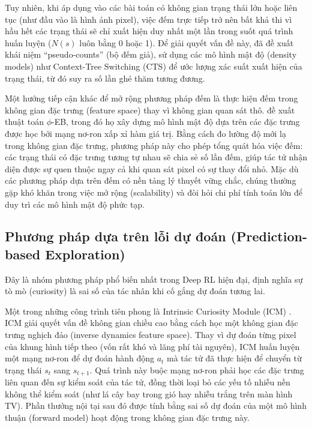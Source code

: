 \documentclass{uetgraduation}
\begin{document}
Tuy nhiên, khi áp dụng vào các bài toán có không gian trạng thái lớn hoặc liên tục (như đầu vào là hình ảnh pixel), việc đếm trực tiếp trở nên bất khả thi vì hầu hết các trạng thái sẽ chỉ xuất hiện duy nhất một lần trong suốt quá trình huấn luyện ($N(s)$ luôn bằng 0 hoặc 1). Để giải quyết vấn đề này, \cite{bellemare2016} đã đề xuất khái niệm ``pseudo-counts'' (bộ đếm giả), sử dụng các mô hình mật độ (density models) như Context-Tree Switching (CTS) để ước lượng xác suất xuất hiện của trạng thái, từ đó suy ra số lần ghé thăm tương đương.

Một hướng tiếp cận khác để mở rộng phương pháp đếm là thực hiện đếm trong không gian đặc trưng (feature space) thay vì không gian quan sát thô. \cite{martin2017} đề xuất thuật toán $\phi$-EB, trong đó họ xây dựng mô hình mật độ dựa trên các đặc trưng được học bởi mạng nơ-ron xấp xỉ hàm giá trị. Bằng cách đo lường độ mới lạ trong không gian đặc trưng, phương pháp này cho phép tổng quát hóa việc đếm: các trạng thái có đặc trưng tương tự nhau sẽ chia sẻ số lần đếm, giúp tác tử nhận diện được sự quen thuộc ngay cả khi quan sát pixel có sự thay đổi nhỏ. Mặc dù các phương pháp dựa trên đếm có nền tảng lý thuyết vững chắc, chúng thường gặp khó khăn trong việc mở rộng (scalability) và đòi hỏi chi phí tính toán lớn để duy trì các mô hình mật độ phức tạp.

\subsection{Phương pháp dựa trên lỗi dự đoán (Prediction-based Exploration)}

Đây là nhóm phương pháp phổ biến nhất trong Deep RL hiện đại, định nghĩa sự tò mò (curiosity) là sai số của tác nhân khi cố gắng dự đoán tương lai.

Một trong những công trình tiên phong là Intrinsic Curiosity Module (ICM) \cite{pathak2017}. ICM giải quyết vấn đề không gian chiều cao bằng cách học một không gian đặc trưng nghịch đảo (inverse dynamics feature space). Thay vì dự đoán từng pixel của khung hình tiếp theo (vốn rất khó và lãng phí tài nguyên), ICM huấn luyện một mạng nơ-ron để dự đoán hành động $a_t$ mà tác tử đã thực hiện để chuyển từ trạng thái $s_t$ sang $s_{t+1}$. Quá trình này buộc mạng nơ-ron phải học các đặc trưng liên quan đến sự kiểm soát của tác tử, đồng thời loại bỏ các yếu tố nhiễu nền không thể kiểm soát (như lá cây bay trong gió hay nhiễu trắng trên màn hình TV). Phần thưởng nội tại sau đó được tính bằng sai số dự đoán của một mô hình thuận (forward model) hoạt động trong không gian đặc trưng này.
\end{document}

